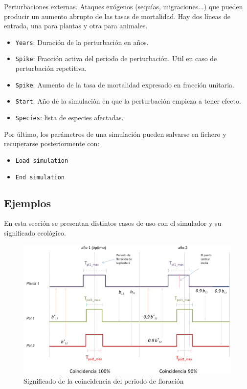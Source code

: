 Perturbaciones externas. Ataques exógenos (sequías, migraciones...) que pueden producir un aumento abrupto de las tasas
de mortalidad. Hay dos líneas de entrada, una para plantas y otra para animales.

\begin{itemize}
 \item \texttt{Years}: Duración de la perturbación en años.
 \item \texttt{Spike}: Fracción activa del periodo de perturbación. Util en caso de perturbación repetitiva.
 \item \texttt{Spike}: Aumento de la tasa de mortalidad expresado en fracción unitaria.
 \item \texttt{Start}: Año de la simulación en que la perturbación empieza a tener efecto.
 \item \texttt{Species}: lista de especies afectadas.
\end{itemize}

Por último, los parámetros de una simulación pueden salvarse en fichero y recuperarse posteriormente con:
\begin{itemize}
 \item \texttt{Load simulation}
 \item \texttt{End simulation}
\end{itemize}

\subsection{Ejemplos}

En esta sección se presentan distintos casos de uso con el simulador y su significado ecológico.

\begin{figure}[h!]
\centering
\includegraphics[scale=1]{ManFigs/sigmund_tiempos.png}
\caption{Significado de la coincidencia del periodo de floración}
\label{fig:ASIGMUNDMAN_sigmund_tiempos}
\end{figure}

